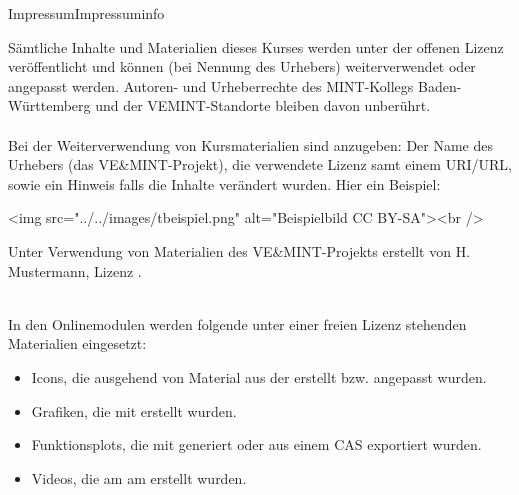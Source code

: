 \begin{MXContent}{Impressum}{Impressum}{info}

Sämtliche Inhalte und Materialien dieses Kurses werden unter
der offenen Lizenz 
veröffentlicht und können (bei Nennung des Urhebers) weiterverwendet oder angepasst werden. Autoren- und Urheberrechte des MINT-Kollegs Baden-Württemberg und
der VEMINT-Standorte bleiben davon unberührt.
\ \\ \ \\
Bei der Weiterverwendung von Kursmaterialien sind anzugeben: Der Name des Urhebers (das VE\&MINT-Projekt), die verwendete Lizenz samt einem URI/URL, sowie ein Hinweis falls
die Inhalte verändert wurden. Hier ein Beispiel:

\begin{center}
\begin{html}
<img src="../../images/tbeispiel.png" alt="Beispielbild CC BY-SA"><br />
\end{html}
Unter Verwendung von Materialien des VE\&MINT-Projekts erstellt von H. Mustermann, Lizenz .
\end{center}
\ \\

In den Onlinemodulen werden folgende unter einer freien Lizenz stehenden Materialien eingesetzt:
\begin{itemize}
\item{Icons, die ausgehend von Material aus der  erstellt bzw. angepasst wurden.}
\item{Grafiken, die mit  erstellt wurden.}
\item{Funktionsplots, die mit  generiert oder aus einem CAS exportiert wurden.}
\item{Videos, die am  am  erstellt wurden.}
\end{itemize}



\end{MXContent}
